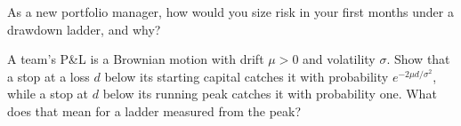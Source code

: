 \begin{interviewq}\label{iq:in:multi-manager-platforms:5}
As a new portfolio manager, how would you size risk in your first months under a drawdown ladder, and why?
\end{interviewq}

\begin{interviewq}\label{iq:in:multi-manager-platforms:6}
A team's P\&L is a Brownian motion with drift $\mu>0$ and volatility $\sigma$. Show that a stop at a loss $d$ below
its starting capital catches it with probability $e^{-2\mu d/\sigma^2}$, while a stop at $d$ below its running peak catches
it with probability one. What does that mean for a ladder measured from the peak?
\end{interviewq}
